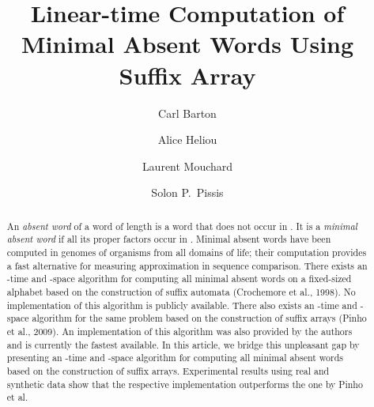 \documentclass{llncs}
\begin{document}
\frontmatter          \title{Linear-time Computation of Minimal Absent Words Using Suffix Array}

\author{Carl Barton
\and Alice Heliou
\and Laurent Mouchard
\and Solon P.\ Pissis
}


\maketitle

\begin{abstract}
  An \textit{absent word} of a word  of length  is a word that does not occur in .
  It is a \textit{minimal absent word} if all its proper factors occur in . 
  Minimal absent words have been computed in genomes of organisms from all domains of life; their computation provides a fast alternative for measuring approximation in sequence comparison.
  There exists an -time and -space algorithm for computing all minimal absent words on a fixed-sized alphabet based on the construction of suffix automata (Crochemore et al., 1998).
  No implementation of this algorithm is publicly available. There also exists an -time and -space algorithm for the same problem based on the construction of suffix arrays (Pinho et al., 2009). 
  An implementation of this algorithm was also provided by the authors and is currently the fastest available.
  In this article, we bridge this unpleasant gap by presenting an -time and -space algorithm for computing all minimal absent words based on the construction of suffix arrays.
  Experimental results using real and synthetic data show that the respective implementation outperforms the one by Pinho et al.
\end{abstract}
\end{document}
